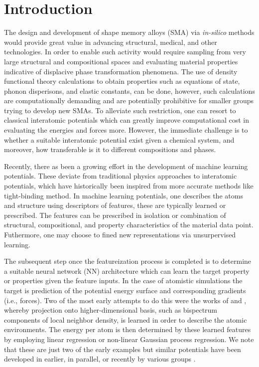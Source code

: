 \documentclass[preprint,colorlinks=true,linkcolor=black,citecolor=black]{elsarticle}
\begin{document}
\section{Introduction}
\label{sec:intro}

The design and development of shape memory alloys (SMA) via
\textit{in-silico} methods would provide great value in advancing
structural, medical, and other technologies. In order to enable such
activity would require sampling from very large structural and
compositional spaces and evaluating material properties indicative of
displacive phase transformation phenomena. The use of density
functional theory calculations to obtain properties such as equations
of state, phonon disperisons, and elastic constants, can be done,
however, such calculations are computationally demanding and are
potentially prohibitive for smaller groups trying to develop new
SMAs. To alleviate such restriction, one can resort to classical
interatomic potentials which can greatly improve computational cost in
evaluating the energies and forces more. However, the immediate
challenge is to whether a suitable interatomic potential exist given a
chemical system, and moreover, how transferable is it to different
compositions and phases. \par

Recently, there as been a growing effort in the development of machine
learning potentials. These deviate from traditional physics approaches
to interatomic potentials, which have historically been inspired from
more accurate methods like tight-binding method. In machine learning
potentials, one describes the atoms and structure using descriptors of
features, these are typically learned or prescribed. The features can
be prescribed in isolation or combination of structural,
compositional, and property characteristics of the material data
point. Futhermore, one may choose to fined new representations via
unsurpervised learning. \par

The subsequent step once the featureization process is completed is to
determine a suitable neural network (NN) architecture which can learn
the target property or properties given the feature inputs. In the
case of atomistic simulations the target is prediction of the
potential energy surface and corresponding gradients (i.e.,
forces). Two of the most early attempts to do this were the works of
\citet{Bartok2010} and \citet{Thompson2015}, whereby projection onto
higher-dimensional basis, such as bispectrum components of local
neighbor density, is learned in order to describe the atomic
environments. The energy per atom is then determined by these learned
features by employing linear regression or non-linear Gaussian process
regression. We note that these are just two of the early examples but
similar potentials have been developed in earlier, in parallel, or
recently by various groups
\cite{Behler2007,Wang2018,Deringer2019,Lee2019}. \par
\end{document}
